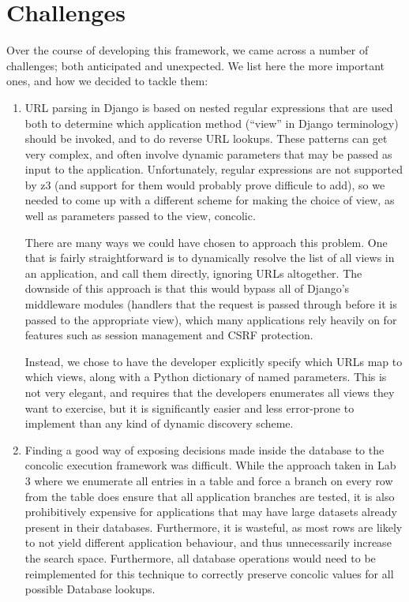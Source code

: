 \documentclass{scrartcl}
\begin{document}
\section{Challenges}
Over the course of developing this framework, we came across a number of
challenges; both anticipated and unexpected. We list here the more important
ones, and how we decided to tackle them:
\begin{enumerate}
	\item URL parsing in Django is based on nested regular expressions that
		are used both to determine which application method (``view''
		in Django terminology) should be invoked, and to do reverse URL
		lookups. These patterns can get very complex, and often involve
		dynamic parameters that may be passed as input to the
		application. Unfortunately, regular expressions are not
		supported by z3 (and support for them would probably prove
		difficule to add), so we needed to come up with a different
		scheme for making the choice of view, as well as parameters
		passed to the view, concolic.

		There are many ways we could have chosen to approach this
		problem. One that is fairly straightforward is to dynamically
		resolve the list of all views in an application, and call them
		directly, ignoring URLs altogether.  The downside of this
		approach is that this would bypass all of Django's middleware
		modules (handlers that the request is passed through before it
		is passed to the appropriate view), which many applications
		rely heavily on for features such as session management and
		CSRF protection.

		Instead, we chose to have the developer explicitly specify
		which URLs map to which views, along with a Python dictionary
		of named parameters. This is not very elegant, and requires
		that the developers enumerates all views they want to exercise,
		but it is significantly easier and less error-prone to
		implement than any kind of dynamic discovery scheme.
	\item Finding a good way of exposing decisions made inside the database
		to the concolic execution framework was difficult. While the
		approach taken in Lab 3 where we enumerate all entries in a
		table and force a branch on every row from the table does
		ensure that all application branches are tested, it is also
		prohibitively expensive for applications that may have large
		datasets already present in their databases. Furthermore, it is
		wasteful, as most rows are likely to not yield different
		application behaviour, and thus unnecessarily increase the
		search space. Furthermore, all database operations would need
		to be reimplemented for this technique to correctly preserve
		concolic values for all possible Database lookups.


\end{enumerate}
\end{document}
